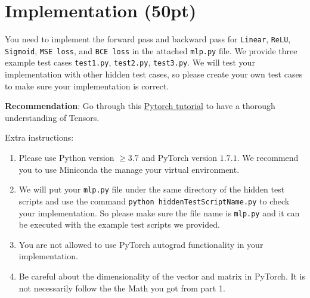 \section{Implementation (50pt)}

You need to implement the forward pass and backward pass for \texttt{Linear}, \texttt{ReLU}, \texttt{Sigmoid}, \texttt{MSE loss}, and \texttt{BCE loss} in the attached \texttt{mlp.py} file.
We provide three example test cases \texttt{test1.py}, \texttt{test2.py}, \texttt{test3.py}.
We will test your implementation with other hidden test cases, so please create your own test cases to make sure your implementation is correct.

\textbf{Recommendation}: Go through this \href{https://pytorch.org/tutorials/beginner/basics/intro.html}{Pytorch tutorial} to have a thorough understanding of Tensors.

Extra instructions:
\begin{enumerate}
\item Please use Python version $\geq 3.7$ and PyTorch version $1.7.1$.
We recommend you to use Miniconda the manage your virtual environment.
\item We will put your \texttt{mlp.py} file under the same directory of the hidden test scripts and use the command \texttt{python hiddenTestScriptName.py} to check your implementation.
So please make sure the file name is \texttt{mlp.py} and it can be executed with the example test scripts we provided.
\item You are not allowed to use PyTorch autograd functionality in your implementation.
\item Be careful about the dimensionality of the vector and matrix in PyTorch.
It is not necessarily follow the the Math you got from part 1.
\end{enumerate}